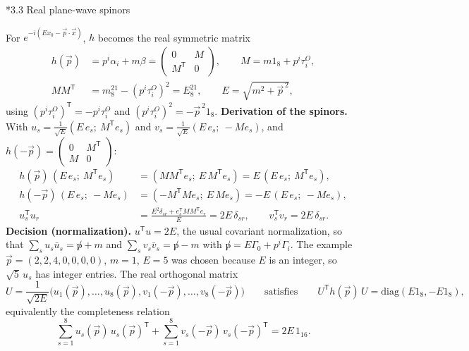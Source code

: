\documentclass[10pt,a4paper]{article}
\makeatletter
\renewcommand\subsection{\@startsection{subsection}{2}{\z@}{-3.25ex\@plus -1ex \@minus -.2ex}{1.5ex \@plus .2ex}{\normalfont\large\bfseries\raggedright}}
\makeatother
\begin{document}
\subsection*{3.3 Real plane-wave spinors}
For $e^{-i(Ex_0-\vec p\cdot\vec x)}$, $h$ becomes the real symmetric matrix
\begin{align*}
h(\vec p)&=p^i\alpha_i+m\beta=\begin{pmatrix}0&M\\M^{\mathsf T}&0\end{pmatrix},\qquad M=m1_8+p^i\tau^{O}_i, \\
MM^{\mathsf T}&=m^21_8-(p^i\tau^{O}_i)^2=E^21_8,\qquad E=\sqrt{m^2+\vec p^{\,2}},
\end{align*}
using $(p^i\tau^{O}_i)^{\mathsf T}=-p^i\tau^{O}_i$ and $(p^i\tau^{O}_i)^2=-\vec p^{\,2}1_8$. \textbf{Derivation of the spinors.} With $u_s=\frac1{\sqrt E}(E\,e_s;\ M^{\mathsf T}e_s)$ and $v_s=\frac1{\sqrt E}(E\,e_s;\ -Me_s)$, and $h(-\vec p)=\left(\begin{smallmatrix}0&M^{\mathsf T}\\M&0\end{smallmatrix}\right)$:
\begin{align*}
h(\vec p)\,(E\,e_s;\ M^{\mathsf T}e_s)&=(MM^{\mathsf T}e_s;\ E\,M^{\mathsf T}e_s)=E\,(E\,e_s;\ M^{\mathsf T}e_s), \\
h(-\vec p)\,(E\,e_s;\ -Me_s)&=(-M^{\mathsf T}Me_s;\ E\,Me_s)=-E\,(E\,e_s;\ -Me_s), \\
u_s^{\mathsf T}u_r&=\frac{E^2\delta_{sr}+e_s^{\mathsf T}MM^{\mathsf T}e_r}{E}=2E\,\delta_{sr},\qquad v_s^{\mathsf T}v_r=2E\,\delta_{sr}.
\end{align*}
\textbf{Decision (normalization).} $u^{\mathsf T}u=2E$, the usual covariant normalization, so that $\sum_su_s\bar u_s=\not p+m$ and $\sum_sv_s\bar v_s=\not p-m$ with $\not p=E\Gamma_0+p^i\Gamma_i$. The example $\vec p=(2,2,4,0,0,0,0)$, $m=1$, $E=5$ was chosen because $E$ is an integer, so $\sqrt5\,u_s$ has integer entries. The real orthogonal matrix
\begin{equation*}
U=\frac1{\sqrt{2E}}\big(u_1(\vec p),\dots,u_8(\vec p),v_1(-\vec p),\dots,v_8(-\vec p)\big)\qquad\text{satisfies}\qquad U^{\mathsf T}h(\vec p)\,U=\mathrm{diag}(E1_8,-E1_8),
\end{equation*}
equivalently the completeness relation
\begin{equation*}
\sum_{s=1}^{8}u_s(\vec p)\,u_s(\vec p)^{\mathsf T}+\sum_{s=1}^{8}v_s(-\vec p)\,v_s(-\vec p)^{\mathsf T}=2E\,1_{16}.
\end{equation*}
\end{document}
